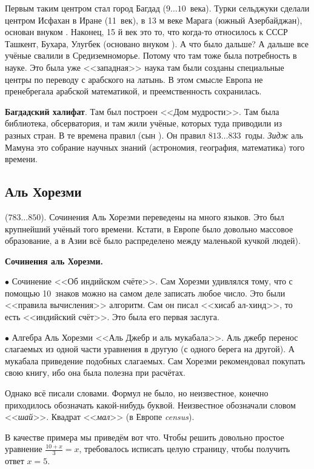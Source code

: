 \documentclass[a4paper,oneside,fleqn,10pt]{article}
\newcommand{\pe}[2]{${#1}\ldots{#2}$}
\begin{document}
Первым таким центром стал город Багдад (\pe{9}{10}~века). Турки
сельджуки сделали центром Исфахан в Иране (11~век), в 13 м веке Марага
(южный Азербайджан), основан внуком .
Наконец, 15 й век это то, что когда-то относилось к СССР Ташкент,
Бухара, Улугбек (основано внуком ). А что было
дальше? А дальше все учёные свалили в Средиземноморье.  Потому что там
тоже была потребность в науке.  Это была уже <<западная>> наука там
были созданы специальные центры по переводу с арабского на латынь. В
этом смысле Европа не пренебрегала арабской математикой, и
преемственность сохранилась.

\textbf{Багдадский халифат}. Там был построен <<Дом мудрости>>. Там
была библиотека, обсерватория, и там жили учёные, которых туда
приводили из разных стран.  В те времена правил  (сын
).  Он правил
\pe{813}{833}~годы. \emph{Зидж} аль Мамуна это собрание научных знаний
(астрономия, география, математика) того времени.

\subsection{Аль Хорезми}

 (\pe{783}{850}). Сочинения Аль Хорезми переведены
на много языков. Это был крупнейший учёный того времени. Кстати, в
Европе было довольно массовое образование, а в Азии всё было
распределено между маленькой кучкой людей).

\textbf{Сочинения аль Хорезми.}

$\bullet$ Сочинение <<Об индийском счёте>>. Сам Хорезми удивлялся
тому, что с помощью 10~знаков можно на самом деле записать любое
число.  Это были <<правила вычисления>> алгоритм.  Сам он писал
<<хисаб ал-хинд>>, то есть <<индийский счёт>>. Это была его первая
заслуга.

$\bullet$ Алгебра Аль Хорезми <<Аль Джебр и аль мукабала>>.  Аль джебр
перенос слагаемых из одной части уравнения в другую (с одного берега
на другой).  А мукабала приведение подобных слагаемых.  Сам Хорезми
рекомендовал покупать свою книгу, ибо она была полезна при расчётах.

Однако всё писали словами. Формул не было, но неизвестное, конечно
приходилось обозначать какой-нибудь буквой. Неизвестное обозначали
словом <<\emph{шай}>>.  Квадрат <<\emph{мал}>> (в Европе
\emph{census}).

В качестве примера мы приведём вот что. Чтобы решить довольно простое
уравнение $\frac{10+x}{3} = x$, требовалось исписать целую страницу,
чтобы получить ответ $x =5$.
\end{document}
